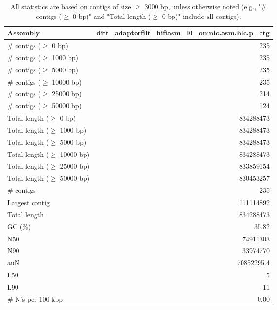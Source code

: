 \documentclass[12pt,a4paper]{article}
\begin{document}
\begin{table}[ht]
\begin{center}
\caption{All statistics are based on contigs of size $\geq$ 3000 bp, unless otherwise noted (e.g., "\# contigs ($\geq$ 0 bp)" and "Total length ($\geq$ 0 bp)" include all contigs).}
\begin{tabular}{|l*{1}{|r}|}
\hline
Assembly & ditt\_adapterfilt\_hifiasm\_l0\_omnic.asm.hic.p\_ctg \\ \hline
\# contigs ($\geq$ 0 bp) & 235 \\ \hline
\# contigs ($\geq$ 1000 bp) & 235 \\ \hline
\# contigs ($\geq$ 5000 bp) & 235 \\ \hline
\# contigs ($\geq$ 10000 bp) & 235 \\ \hline
\# contigs ($\geq$ 25000 bp) & 214 \\ \hline
\# contigs ($\geq$ 50000 bp) & 124 \\ \hline
Total length ($\geq$ 0 bp) & 834288473 \\ \hline
Total length ($\geq$ 1000 bp) & 834288473 \\ \hline
Total length ($\geq$ 5000 bp) & 834288473 \\ \hline
Total length ($\geq$ 10000 bp) & 834288473 \\ \hline
Total length ($\geq$ 25000 bp) & 833859154 \\ \hline
Total length ($\geq$ 50000 bp) & 830453257 \\ \hline
\# contigs & 235 \\ \hline
Largest contig & 111114892 \\ \hline
Total length & 834288473 \\ \hline
GC (\%) & 35.82 \\ \hline
N50 & 74911303 \\ \hline
N90 & 33974770 \\ \hline
auN & 70852295.4 \\ \hline
L50 & 5 \\ \hline
L90 & 11 \\ \hline
\# N's per 100 kbp & 0.00 \\ \hline
\end{tabular}
\end{center}
\end{table}
\end{document}
